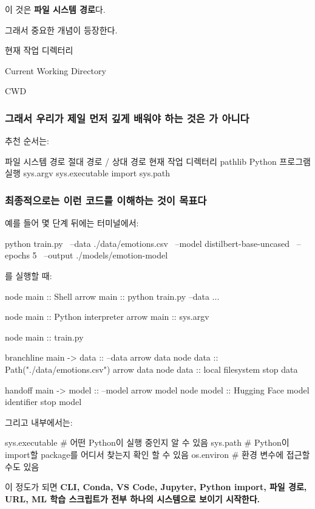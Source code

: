 이 것은 \textbf{파일 시스템 경로}다.

그래서 중요한 개념이 등장한다.

\begin{dhknote}
\begin{dhksmry}[centered]
현재 작업 디렉터리

Current Working Directory

CWD
\end{dhksmry}
\end{dhknote}

\subsubsection{그래서 우리가 제일 먼저 깊게 배워야 하는 것은 가 아니다}

추천 순서는:

\begin{dhksmry}[centered]
파일 시스템
\da
경로
\da
절대 경로 / 상대 경로
\da
현재 작업 디렉터리
\da
pathlib
\da
Python 프로그램 실행
\da
sys.argv
\da
sys.executable
\da
import
\da
sys.path
\end{dhksmry}

\subsubsection{최종적으로는 이런 코드를 이해하는 것이 목표다}

예를 들어 몇 단계 뒤에는 터미널에서:

\begin{dhkzsh}
python train.py \
    --data ./data/emotions.csv \
    --model distilbert-base-uncased \
    --epochs 5 \
    --output ./models/emotion-model
\end{dhkzsh}

를 실행할 때:

\begin{dhkbranch}[in=5]
node main :: Shell
arrow main :: python train.py --data ...

node main :: Python interpreter
arrow main :: sys.argv

node main :: train.py

branchline main -> data :: --data
arrow data
node data :: Path("./data/emotions.csv")
arrow data
node data :: local filesystem
stop data

handoff main -> model :: --model
arrow model
node model :: Hugging Face model identifier
stop model
\end{dhkbranch}

그리고 내부에서는:

\begin{dhkcode}
sys.executable # 어떤 Python이 실행 중인지 알 수 있음
sys.path # Python이 import할 package를 어디서 찾는지 확인 할 수 있음
os.environ # 환경 변수에 접근할 수도 있음
\end{dhkcode}

이 정도가 되면 \textbf{CLI, Conda, VS Code, Jupyter, Python import, 파일 경로, URL, ML 학습 스크립트가 전부 하나의 시스템으로 보이기 시작한다.}

